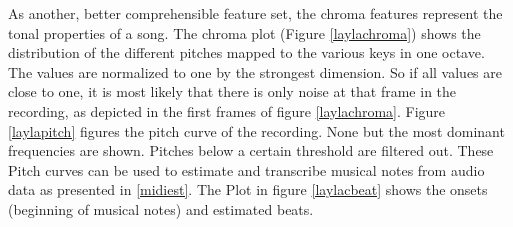 As another, better comprehensible feature set, the chroma features represent the tonal properties of a song. The chroma plot (Figure \ref{laylachroma}) shows the distribution of the different pitches mapped to the various keys in one octave. The values are normalized to one by the strongest dimension. So if all values are close to one, it is most likely that there is only noise at that frame in the recording, as depicted in the first frames of figure \ref{laylachroma}.
Figure \ref{laylapitch} figures the pitch curve of the recording. None but the most dominant frequencies are shown. Pitches below a certain threshold are filtered out. These Pitch curves can be used to estimate and transcribe musical notes from audio data as presented in \ref{midiest}. 
The Plot in figure \ref{laylacbeat} shows the onsets (beginning of musical notes) and estimated beats.

